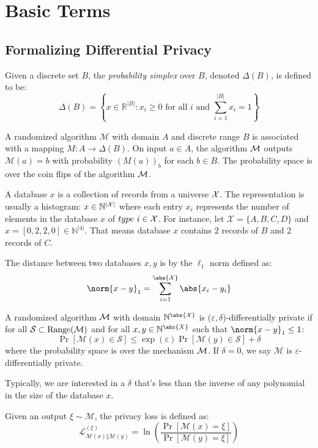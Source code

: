 \chapter{Basic Terms}
\section{Formalizing Differential Privacy}
\begin{definition}
    Given a discrete set $B$, the \textit{probability simplex} over $B$, denoted $\Delta(B)$, is defined to be:
    \[
        \Delta(B) = \left\{ x \in \mathbb{R}^{|B|} : x_i \ge 0 \text{ for all } i \text{ and } \sum_{i=1}^{|B|} x_i = 1 \right\}
    \]
\end{definition}
\begin{definition}
    A randomized algorithm $\mathcal{M}$ with domain $A$ and discrete range $B$ is associated with a mapping $M: A \rightarrow \Delta(B)$. On input $a \in A$, the algorithm $\cal{M}$ outputs $\mathcal{M}(a) = b$ with probability $(M(a))_b$ for each $b \in B$. The probability space is over the coin flips of the algorithm $\cal{M}$.
\end{definition}
A database $x$ is a collection of records from a universe $\cal{X}$. The representation is usually a histogram: $x \in \mathbb{N}^{|\cal{X}|}$  where each entry $x_i$ represents the number of elements in the database $x$ of $type \ i \in \cal{X}$. For instance, let \( \mathcal{X} = \{ A, B, C, D \} \) and \( x = [0, 2, 2, 0] \in \mathbb{N}^{\vert 4 \vert }\). That means database \( x \) contains 2 records of \(B\) and 2 records of \(C\).
\begin{definition}
    The distance between two databases \(x, y\) is by the \( \ell_1 \) norm defined as:
    \[
        \norm{x - y}_1 = \sum_{i=1}^{\abs{\cal{X}}} \abs{x_i - y_i}
    \]
\end{definition}
\begin{definition}
    A randomized algorithm \(\cal{M}\) with domain \(\mathbb{N}^{\abs{\cal{X}}}\)  is (\(\varepsilon, \delta\))-differentially private if for all \(\cal{S} \subset \text{Range}(\cal{M})\) and for all \(x, y \in \mathbb{N}^{\abs{X}}\)  such that \(\norm{x - y}_1 \le 1 \):
    \[
        \Pr \left[\mathcal{M}(x) \in \mathcal{S}\right] \le \exp (\varepsilon) \Pr \left[\mathcal{M}(y) \in \mathcal{S}\right] + \delta
    \]
    where the probability space is over the mechanism \(\cal{M}\). If \(\delta = 0\), we say \(\mathcal{M}\) is \(\varepsilon\)-differentially private.
\end{definition}
Typically, we are interested in a \(\delta\) that's less than the inverse of any polynomial in the size of the database \(x\).
\begin{definition}
    Given an output \(\xi \sim \mathcal{M}\), the privacy loss is defined as:
    \[
        \mathcal{L}_{\mathcal{M}(x) \Vert \mathcal{M}(y)}^{(\xi)} = \ln \left(
            \frac{\Pr \left[\mathcal{M}(x) = \xi\right]}{\Pr \left[\mathcal{M}(y) = \xi\right]}
        \right)
    \]
\end{definition}
